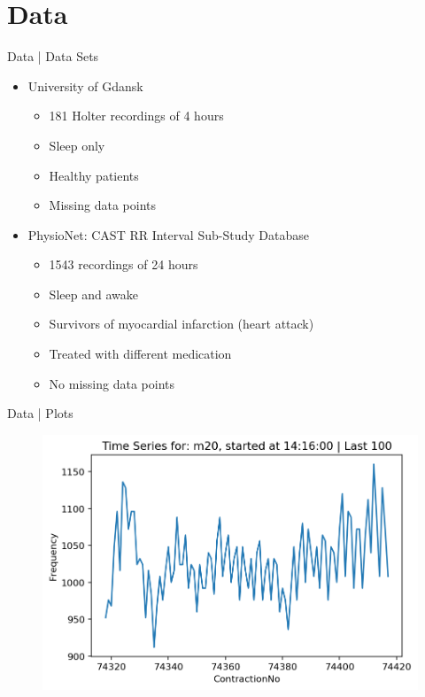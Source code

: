 \documentclass{beamer}
\begin{document}
    \section{Data}
    \begin{frame}{Data | Data Sets}
        \begin{itemize}
            \item University of Gdansk
            \begin{itemize}
                \item 181 Holter recordings of 4 hours
                \item Sleep only
                \item Healthy patients
                \item Missing data points
            \end{itemize}
            \item PhysioNet: CAST RR Interval Sub-Study Database
            \begin{itemize}
                \item 1543 recordings of 24 hours
                \item Sleep and awake
                \item Survivors of myocardial infarction (heart attack)
                \item Treated with different medication
                \item No missing data points
            \end{itemize}
        \end{itemize}
    \end{frame}
    
    \begin{frame}{Data | Plots}
        \begin{figure}[hbt]
        	\center
        	\includegraphics[width=1.0\textwidth]{img/example_data2.png}
        	\label{fig:example2}
        \end{figure}
    \end{frame}
    
\end{document}
